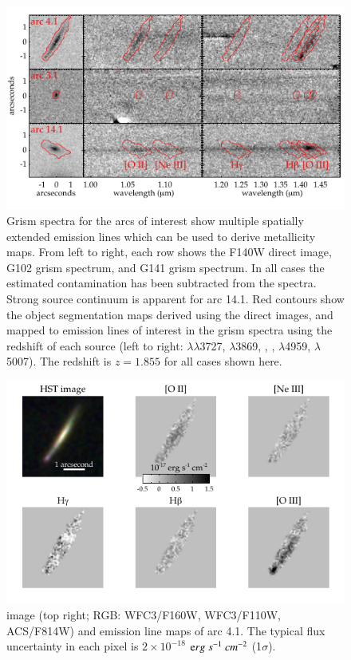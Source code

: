\begin{figure}
    \centering
    \includegraphics[width=\textwidth]{figures/figure_arcs_spectra_v2.pdf}
    \caption[Grism spectra for the arcs of interest show multiple spatially extended emission lines.]{Grism spectra for the arcs of interest show multiple spatially extended emission
    lines which can be used to derive metallicity maps. From left to right, each row shows the F140W direct
    image, G102 grism spectrum, and G141 grism spectrum. In all cases the estimated contamination has been
    subtracted from the spectra. Strong source continuum is apparent for arc 14.1. Red contours show the object
    segmentation maps derived using the direct images, and mapped to emission lines of interest in the grism
    spectra using the redshift of each source (left to right: \OII $\lambda\lambda$3727, \NeIII $\lambda$3869,
    \Hg, \Hb, \OIII $\lambda$4959, \OIII $\lambda$5007). The redshift is $z=1.855$ for all cases shown here.
    \label{fig:spec2d}}
\end{figure}

\begin{figure}
    \centering
    \includegraphics[width=\textwidth]{figures/figure_arc41_linemaps.pdf}
    \caption[\hst image and emission line maps.]{\hst image (top right; RGB: WFC3/F160W, WFC3/F110W, ACS/F814W) and emission line maps of arc 4.1.
    The typical flux uncertainty in each pixel is $2 \times 10^{-18}$ $\mathrm erg~s^{-1}~cm^{-2}$ (1$\sigma$).
    \label{fig:spec2d_arc4}}
\end{figure}


